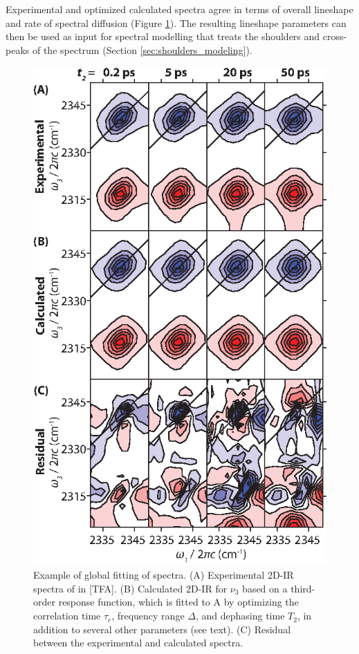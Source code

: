 Experimental and optimized calculated spectra agree in terms of overall lineshape and rate of spectral diffusion (Figure \ref{fig:TFA 2D fit}). The resulting lineshape parameters can then be used as input for spectral modelling that treats the shoulders and cross-peaks of the spectrum (Section \ref{sec:shoulders_modeling}).

\begin{figure}
	\includegraphics[scale=1]{./anions/fig8.eps}
	\caption[Example of global fitting of 2D-IR spectra]{\label{fig:TFA 2D fit}Example of global fitting of spectra. (A) Experimental 2D-IR spectra of  in \ce{[Im_{4,1}]}[TFA]. (B) Calculated 2D-IR for $\nu_3$ based on a third-order response function, which is fitted to A by optimizing the correlation time $\tau_c$, frequency range $\Delta$, and dephasing time $T_2$, in addition to several other parameters (see text). (C) Residual between the experimental and calculated spectra.}
\end{figure}

